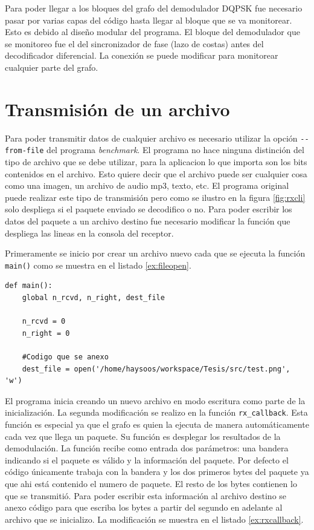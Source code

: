 Para poder llegar a los bloques del grafo del demodulador DQPSK fue necesario pasar por varias capas
del c\'odigo hasta llegar al bloque que se va monitorear. Esto es debido al dise\~no modular del
programa. El bloque del demodulador que se monitoreo fue el del sincronizador de fase (lazo de
costas) antes del decodificador diferencial. La conexi\'on se puede modificar para monitorear
cualquier parte del grafo.

\section{Transmisi\'on de un archivo}
Para poder transmitir datos de cualquier archivo es necesario utilizar la opci\'on
\verb|--from-file| del programa \emph{benchmark}. El programa no hace ninguna distinci\'on del tipo
de archivo que se debe utilizar, para la aplicacion lo que importa son los bits contenidos en el
archivo. Esto quiere decir que el archivo puede ser cualquier cosa como una imagen, un archivo de
audio mp3, texto, etc. El programa original puede realizar este tipo de transmisi\'on pero como se
ilustro en la figura \ref{fig:rxcli} solo despliega si el paquete enviado se decodifico o no. Para
poder escribir los datos del paquete a un archivo destino fue necesario modificar la funci\'on que
despliega las lineas en la consola del receptor.

Primeramente se inicio por crear un archivo nuevo cada que se ejecuta la funci\'on \verb|main()|
como se muestra en el listado \ref{ex:fileopen}.

\begin{lstlisting}[float, label=ex:fileopen, caption={C\'odigo anexo a la funci\'on main del
programa benchmark para abrir un nuevo archivo destino.}, breaklines=true]
def main():
    global n_rcvd, n_right, dest_file

    n_rcvd = 0
    n_right = 0

	#Codigo que se anexo
    dest_file = open('/home/haysoos/workspace/Tesis/src/test.png', 'w')
\end{lstlisting}

El programa inicia creando un nuevo archivo en modo escritura como parte de la inicializaci\'on. La
segunda modificaci\'on se realizo en la funci\'on \verb|rx_callback|. Esta funci\'on es
especial ya que el grafo es quien la ejecuta de manera autom\'aticamente cada vez que llega un
paquete. Su funci\'on es desplegar los resultados de la demodulaci\'on. La funci\'on recibe como
entrada dos par\'ametros: una bandera indicando si el paquete es v\'alido y la informaci\'on del
paquete. Por defecto el c\'odigo \'unicamente trabaja con la bandera y los dos primeros bytes del
paquete ya que ahi est\'a contenido el numero de paquete. El resto de los bytes contienen lo que se
transmiti\'o. Para poder escribir esta informaci\'on al archivo destino se anexo c\'odigo para que
escriba los bytes a partir del segundo en adelante al archivo que se inicializo. La modificaci\'on
se muestra en el listado \ref{ex:rxcallback}.

